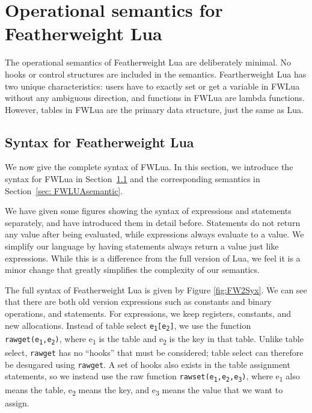 \chapter{Operational semantics for Featherweight Lua} \label{chp: syntax and semantic}
The operational semantics of Featherweight Lua are deliberately minimal. No hooks or control structures are included in the semantics. Feartherweight Lua has two unique characteristics:
users have to exactly set or get a variable in FWLua without any ambiguous direction, and functions in FWLua are lambda functions.
However, tables in FWLua are the primary data structure, just the same as Lua.

\section{Syntax for Featherweight Lua}\label{sec: FWLUAsyntax}
We now give the complete syntax of FWLua. In this section, we introduce the syntax for FWLua in Section~\ref{sec: FWLUAsyntax} and the corresponding semantics in Section~\ref{sec: FWLUAsemantic}.

We have given some figures showing the syntax of expressions and statements separately, and have introduced them in detail before.
Statements do not return any value after being evaluated, while expressions always evaluate to a value.
We simplify our language by
having statements always return a value just like expressions.
While this is a difference from the full version of Lua,
we feel it is a minor change that greatly simplifies the complexity
of our semantics.

The full syntax of Featherweight Lua is given by Figure \ref{fig:FW2Syx}. We can see that there are both old version expressions such as constants and binary operations, and statements. For expressions, we keep registers, constants, and new allocations.
Instead of table select {\tt e\textsubscript{1}[e\textsubscript{2}]}, we use the function {\tt rawget(e\textsubscript{1},e\textsubscript{2})}, where e\textsubscript{1} is the table and e\textsubscript{2} is the key in that table.
Unlike table select, {\tt rawget} has no ``hooks'' that must be considered; table select can therefore be desugared using {\tt rawget}.
A set of hooks also exists in the table assignment statements, so we instead use the raw function {\tt rawset(e\textsubscript{1},e\textsubscript{2},e\textsubscript{3})}, where e\textsubscript{1} also means the table, e\textsubscript{2} means the key, and e\textsubscript{3} means the value that we want to assign.

